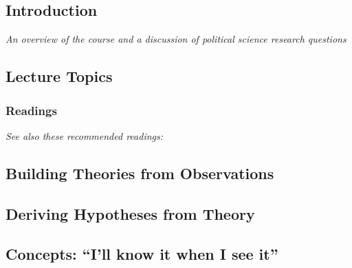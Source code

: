 \documentclass[12pt,a4paper]{article}
\newcommand{\thomas}{\vspace{1em}\noindent Instructor: Thomas\\}
\newcommand{\seealso}{\noindent \emph{See also these recommended readings:}}
\begin{document}
\secttoc

\clearpage


\subsection{Introduction} %
\emph{An overview of the course and a discussion of political science research questions}


\subsection*{Lecture Topics}

\begin{itemize*}
\item 
\end{itemize*}

\subsubsection*{Readings}



\seealso

\subsection{Building Theories from Observations} %

\subsection{Deriving Hypotheses from Theory} %

\subsection{Concepts: ``I'll know it when I see it''}
\end{document}

